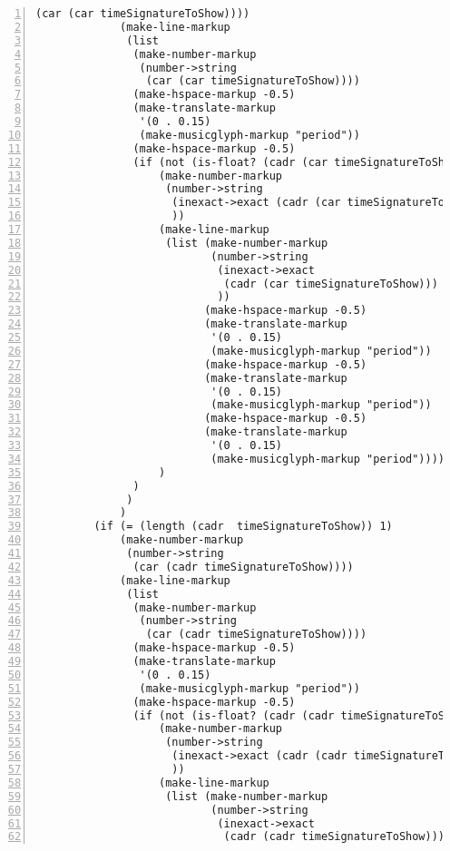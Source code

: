 \begin{Verbatim}[numbers=left,xleftmargin=5mm]
               (car (car timeSignatureToShow))))
             (make-line-markup
              (list
               (make-number-markup
                (number->string
                 (car (car timeSignatureToShow))))
               (make-hspace-markup -0.5)
               (make-translate-markup
                '(0 . 0.15)
                (make-musicglyph-markup "period"))
               (make-hspace-markup -0.5)
               (if (not (is-float? (cadr (car timeSignatureToShow))))
                   (make-number-markup
                    (number->string
                     (inexact->exact (cadr (car timeSignatureToShow)))
                     ))
                   (make-line-markup
                    (list (make-number-markup
                           (number->string
                            (inexact->exact
                             (cadr (car timeSignatureToShow)))
                            ))
                          (make-hspace-markup -0.5)
                          (make-translate-markup
                           '(0 . 0.15)
                           (make-musicglyph-markup "period"))
                          (make-hspace-markup -0.5)
                          (make-translate-markup
                           '(0 . 0.15)
                           (make-musicglyph-markup "period"))
                          (make-hspace-markup -0.5)
                          (make-translate-markup
                           '(0 . 0.15)
                           (make-musicglyph-markup "period"))))
                   )
               )
              )
             )
         (if (= (length (cadr  timeSignatureToShow)) 1)
             (make-number-markup
              (number->string
               (car (cadr timeSignatureToShow))))
             (make-line-markup
              (list
               (make-number-markup
                (number->string
                 (car (cadr timeSignatureToShow))))
               (make-hspace-markup -0.5)
               (make-translate-markup
                '(0 . 0.15)
                (make-musicglyph-markup "period"))
               (make-hspace-markup -0.5)
               (if (not (is-float? (cadr (cadr timeSignatureToShow))))
                   (make-number-markup
                    (number->string
                     (inexact->exact (cadr (cadr timeSignatureToShow)))
                     ))
                   (make-line-markup
                    (list (make-number-markup
                           (number->string
                            (inexact->exact
                             (cadr (cadr timeSignatureToShow)))

\end{Verbatim}
